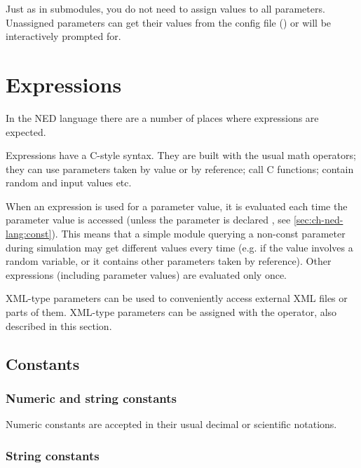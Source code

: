 Just as in submodules, you do not need to assign values to all
parameters. Unassigned parameters can get their values from the
config file () or will be interactively prompted for.



\section{Expressions}
\label{ch-ned-lang:sec:expressions}

In the NED language there are a number of places where
expressions are expected.

Expressions have a C-style syntax. They are built with the usual math
operators; they can use parameters taken by
value or by reference; call C functions; contain random and input
values etc.

When an expression is used for a parameter value, it is evaluated
each time the parameter value is accessed (unless the parameter is
declared , see \ref{sec:ch-ned-lang:const}). This means
that a simple module querying a non-const parameter during simulation
may get different values every time (e.g. if the value involves a
random variable, or it contains other parameters taken by reference).
Other expressions (including  parameter values)
are evaluated only once.

XML-type parameters can be used to conveniently access external
XML files or parts of them. XML-type parameters can be assigned
with the  operator, also described in this section.


\subsection{Constants}

\subsubsection{Numeric and string constants}

Numeric constants are accepted in their usual decimal or
scientific notations.


\subsubsection{String constants}

